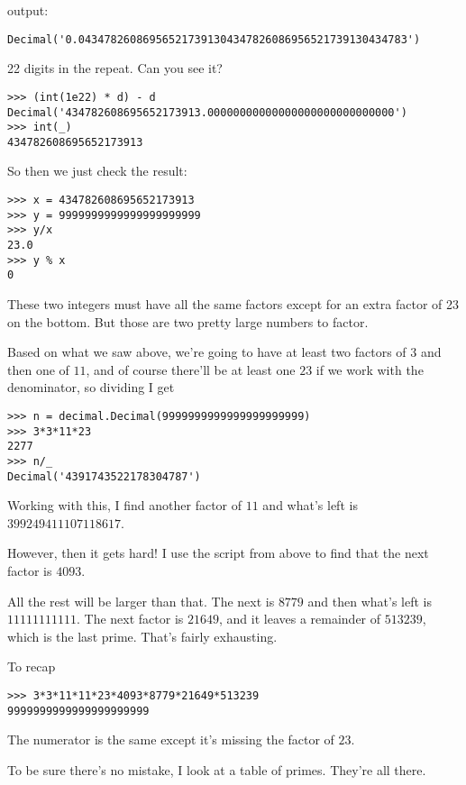 \documentclass[11pt, oneside]{article}
\begin{document}
output:

\begin{verbatim}
Decimal('0.043478260869565217391304347826086956521739130434783')
\end{verbatim}

22 digits in the repeat.  Can you see it?

\begin{verbatim}
>>> (int(1e22) * d) - d
Decimal('434782608695652173913.00000000000000000000000000000')
>>> int(_)
434782608695652173913
\end{verbatim}

So then we just check the result:

\begin{verbatim}
>>> x = 434782608695652173913
>>> y = 9999999999999999999999
>>> y/x
23.0
>>> y % x
0
\end{verbatim}

These two integers must have all the same factors except for an extra factor of 23 on the bottom.  But those are two pretty large numbers to factor.  

Based on what we saw above, we're going to have at least two factors of $3$ and then one of $11$, and of course there'll be at least one $23$ if we work with the denominator, so dividing I get 

\begin{verbatim}
>>> n = decimal.Decimal(9999999999999999999999)
>>> 3*3*11*23
2277
>>> n/_
Decimal('4391743522178304787')
\end{verbatim}

Working with this, I find another factor of $11$ and what's left is $399249411107118617$. 

However, then it gets hard!  I use the script from above to find that the next factor is $4093$.

All the rest will be larger than that.  The next is $8779$ and then what's left is $11111111111$.  The next factor is $21649$, and it leaves a remainder of $513239$, which is the last prime.  That's fairly exhausting.

To recap

\begin{verbatim}
>>> 3*3*11*11*23*4093*8779*21649*513239
9999999999999999999999
\end{verbatim}

The numerator is the same except it's missing the factor of $23$.

To be sure there's no mistake, I look at a table of primes.  They're all there.
\end{document}
